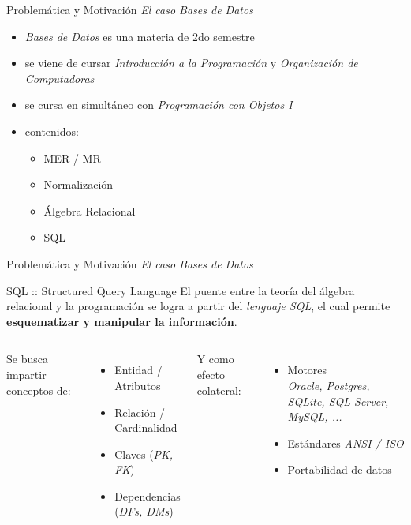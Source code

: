 \documentclass{beamer}
\begin{document}
\begin{frame}
    {Problemática y Motivación}
    {\emph{El caso Bases de Datos}}

    \begin{itemize}
        \item \emph{Bases de Datos} es una materia de 2do semestre
        \item se viene de cursar \emph{Introducción a la Programación}
        y \emph{Organización de Computadoras}
        \item se cursa en simultáneo con \emph{Programación con Objetos I}
        \item contenidos:
            \begin{itemize}
                \item MER / MR
                \item Normalización
                \item Álgebra Relacional
                \item SQL
            \end{itemize}
    \end{itemize}
\end{frame}

\begin{frame}
    {Problemática y Motivación}
    {\emph{El caso Bases de Datos}}

    \begin{block}{SQL :: Structured Query Language}
        El puente entre la teoría del álgebra relacional y la
        programación se logra a partir del \emph{lenguaje SQL},
        el cual permite \textbf{esquematizar y manipular la información}.
    \end{block}

    \vspace{1.5em}

    \begin{columns}[t]
        Se busca impartir conceptos de:
        \begin{itemize}
            \item Entidad / Atributos
            \item Relación / Cardinalidad
            \item Claves ({\footnotesize\emph{PK, FK}})
            \item Dependencias ({\footnotesize\emph{DFs, DMs}})
        \end{itemize}

        Y como efecto colateral:
        \begin{itemize}
            \item Motores \\ {\footnotesize\emph{Oracle, Postgres, SQLite, SQL-Server, MySQL, ...}}
            \item Estándares {\footnotesize\emph{ANSI / ISO}}
            \item Portabilidad de datos
        \end{itemize}

    \end{columns}

\end{frame}
\end{document}
